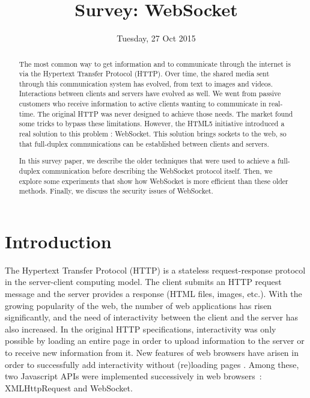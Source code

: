 \documentclass[10pt,journal,compsoc]{IEEEtran}
\newcommand{\ws}{WebSocket}
\begin{document}
\author{}

\title{Survey: \ws }

\date{Tuesday, 27 Oct 2015}


\maketitle
\IEEEpeerreviewmaketitle



\begin{abstract}
The most common way to get information and to communicate through the internet is via the Hypertext Transfer Protocol (HTTP).
Over time, the shared media sent through this communication system has evolved, from text to images and videos.
Interactions between clients and servers have evolved as well.
We went from passive customers who receive information to active clients wanting to communicate in real-time.
The original HTTP was never designed to achieve those needs.
The market found some tricks to bypass these limitations.
However, the HTML5 initiative introduced a real solution to this problem : \ws{}.
This solution brings sockets to the web, so that full-duplex communications can be established between clients and servers.

In this survey paper, we describe the older techniques that were used to achieve a full-duplex communication before describing the \ws{} protocol itself.
Then, we explore some experiments that show how \ws{} is more efficient than these older methods.
Finally, we discuss the security issues of \ws{}.
\end{abstract}


\section{Introduction}

The Hypertext Transfer Protocol (HTTP) is a stateless request-response protocol in the server-client computing model.
The client submits an HTTP request message and the server provides a response (HTML files, images, etc.).
With the growing popularity of the web, the number of web applications has risen significantly, and the need of interactivity between the client and the server has also increased. %
In the original HTTP specifications, interactivity was only possible by loading an entire page in order to upload information to the server or to receive new information from it. %
New features of web browsers have arisen in order to successfully add interactivity without (re)loading pages \cite{RealTimeMonitoringUsingAJAXAndWebSockets}.
Among these, two Javascript APIs were implemented successively in web \mbox{browsers :} XMLHttpRequest and \ws. 
\end{document}
